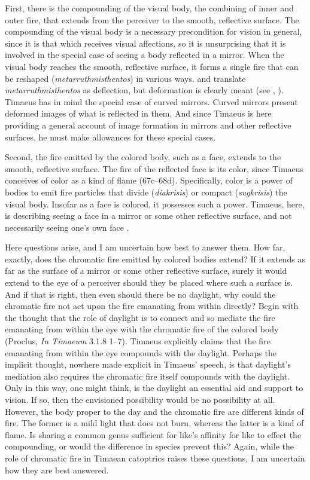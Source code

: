 First, there is the compounding of the visual body, the combining of inner and outer fire, that extends from the perceiver to the smooth, reflective surface. The compounding of the visual body is a necessary precondition for vision in general, since it is that which receives visual affections, so it is unsurprising that it is involved in the special case of seeing a body reflected in a mirror. When the visual body reaches the smooth, reflective surface, it forms a single fire that can be reshaped (\emph{metarruthmisthentos}) in various ways. \citet[159]{Archer-Hind:1888qd} and \citet[103]{Bury:1929jb} translate \emph{metarruthmisthentos} as deflection, but deformation is clearly meant (see \citealt[287]{Taylor:1928qb}, \citealt[154]{Cornford:1935fk}). Timaeus has in mind the special case of curved mirrors. Curved mirrors present deformed images of what is reflected in them. And since Timaeus is here providing a general account of image formation in mirrors and other reflective surfaces, he must make allowances for these special cases. 

Second, the fire emitted by the colored body, such as a face, extends to the smooth, reflective surface. The fire of the reflected face is its color, since Timaeus conceives of color as a kind of flame (67c–68d). Specifically, color is a power of bodies to emit fire particles that divide (\emph{diakrisis}) or compact (\emph{sugkrisis}) the visual body. Insofar as a face is colored, it possesses such a power. Timaeus, here, is describing seeing a face in a mirror or some other reflective surface, and not necessarily seeing one's own face \citep[286--7]{Taylor:1928qb}. 

Here questions arise, and I am uncertain how best to answer them. How far, exactly, does the chromatic fire emitted by colored bodies extend? If it extends as far as the surface of a mirror or some other reflective surface, surely it would extend to the eye of a perceiver should they be placed where such a surface is. And if that is right, then even should there be no daylight, why could the chromatic fire not act upon the fire emanating from within directly? Begin with the thought that the role of daylight is to connect and so mediate the fire emanating from within the eye with the chromatic fire of the colored body (Proclus, \emph{In Timaeum} 3.1.8 1--7). Timaeus explicitly claims that the fire emanating from within the eye compounds with the daylight. Perhaps the implicit thought, nowhere made explicit in Timaeus' speech, is that daylight's mediation also requires the chromatic fire itself compounds with the daylight. Only in this way, one might think, is the daylight an essential aid and support to vision. If so, then the envisioned possibility would be no possibility at all. However, the body proper to the day and the chromatic fire are different kinds of fire. The former is a mild light that does not burn, whereas the latter is a kind of flame. Is sharing a common genus sufficient for like's affinity for like to effect the compounding, or would the difference in species prevent this? Again, while the role of chromatic fire in Timaean catoptrics raises these questions, I am uncertain how they are best answered.

